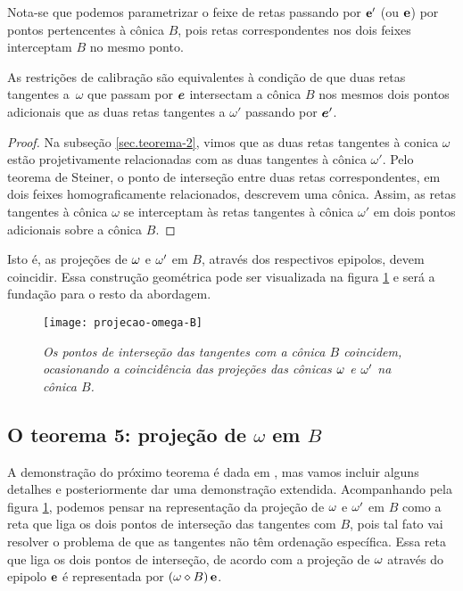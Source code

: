 Nota-se que podemos parametrizar o feixe de retas passando por ${\bf e'}$ (ou ${\bf e}$) por pontos pertencentes à cônica $B$, pois retas correspondentes nos dois feixes interceptam $B$ no mesmo ponto. 

\begin{teorema}
As restrições de calibração são equivalentes à condição de que duas retas tangentes a\, $\omega$ que passam por $\boldsymbol{e}$ intersectam a cônica $B$ nos mesmos dois pontos adicionais que as duas retas tangentes a $\omega'$ passando por $\boldsymbol{e}'$.
\end{teorema}

\begin{proof}
Na subseção \ref{sec.teorema-2}, vimos que as duas retas tangentes à conica $\omega$ estão projetivamente relacionadas com as duas tangentes à cônica $\omega'$. Pelo teorema de Steiner, o ponto de interseção entre duas retas correspondentes, em dois feixes homograficamente relacionados, descrevem uma cônica. Assim, as retas tangentes à cônica $\omega$ se interceptam às retas tangentes à cônica $\omega'$ em dois pontos adicionais sobre a cônica $B$. 
\end{proof}

Isto é, as projeções de ${\bf \omega}$ e ${\bf \omega'}$ em $B$, através dos respectivos epipolos, devem coincidir. Essa construção geométrica pode ser visualizada na figura \ref{omega-B} e será a fundação para o resto da abordagem. 

\begin{figure}[!htb]
\centering
\texttt{[image: projecao-omega-B]}
\caption{\textit{Os pontos de interseção das tangentes com a cônica $B$ coincidem, ocasionando a coincidência das projeções das cônicas ${\bf \omega}$ e ${\bf \omega'}$ na cônica $B$.}}
\label{omega-B}
\end{figure}

\subsection{O teorema 5: projeção de $\omega$ em $B$}\label{sec.teorema-5}

 A demonstração do próximo teorema é dada em \cite{2503343}, mas vamos incluir alguns detalhes e posteriormente dar uma demonstração extendida. Acompanhando pela figura \ref{omega-B}, podemos pensar na representação da projeção de  ${\bf \omega}$ e ${\bf \omega'}$ em $B$ como a reta que liga os dois pontos de interseção das tangentes com $B$, pois tal fato vai resolver o problema de que as tangentes não têm ordenação específica. Essa reta que liga os dois pontos de interseção, de acordo com a projeção de ${\bf \omega}$ através do epipolo ${\bf e}$ é representada por $({\bf \omega}\diamond B)\,{\bf e}$.

